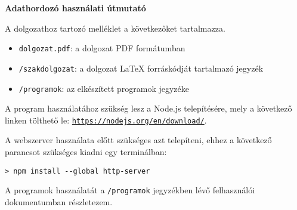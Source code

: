 \pagestyle{empty}

\noindent \textbf{\Large Adathordozó használati útmutató}

\vskip 1cm

\noindent A dolgozathoz tartozó melléklet a következőket tartalmazza.
\begin{itemize}
\item \texttt{dolgozat.pdf}: a dolgozat PDF formátumban
\item \texttt{/szakdolgozat}: a dolgozat \LaTeX{} forráskódját tartalmazó jegyzék
\item \texttt{/programok}: az elkészített programok jegyzéke
\end{itemize}

\noindent A program használatához szükség lesz a Node.js telepítésére, mely a következő linken tölthető le: \href{https://nodejs.org/en/download/}{\texttt{https://nodejs.org/en/download/}}.

\noindent A webszerver használata előtt szükséges azt telepíteni, ehhez a következő parancsot szükséges kiadni egy terminálban:
\begin{verbatim}
> npm install --global http-server
\end{verbatim}
A programok használatát a \texttt{/programok} jegyzékben lévő felhasználói dokumentumban részletezem.